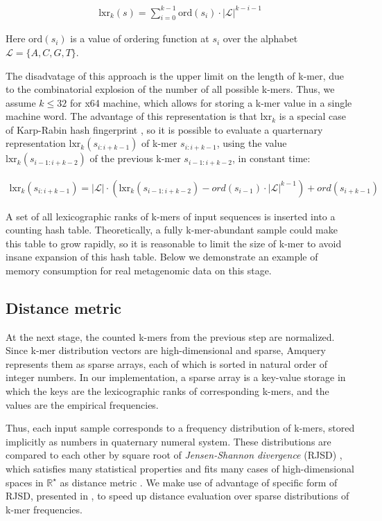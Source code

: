 \documentclass[10pt,letterpaper]{article}
\begin{document}
\begin{eqnarray}
\label{eq:schemeP}
    \mathrm{lxr}_k(s) = \sum_{i=0}^{k−1} \mathrm{ord}(s_i) \cdot |{\mathcal{L}}|^{k−i−1}
\end{eqnarray}

Here $\mathrm{ord}(s_i)$ is a value of ordering function at $s_i$ over the alphabet ${\mathcal{L}} = \{A, C, G, T \}$. 

The disadvatage of this approach is the upper limit on the length of k-mer, due to the combinatorial explosion of the number of all possible k-mers. Thus, we assume $k \leq 32$ for x64 machine, which allows for storing a k-mer value in a single machine word.
The advantage of this representation is that $\mathrm{lxr}_k$ is a special case of Karp-Rabin hash fingerprint \cite{karp1987efficient}, so it is possible to evaluate a quarternary representation $\mathrm{lxr}_k(s_{i:i+k-1})$ of k-mer $s_{i:i+k-1}$, using the value $\mathrm{lxr}_k(s_{i−1:i+k-2})$ of the previous k-mer $s_{i−1:i+k-2}$, in constant time:

\begin{eqnarray}
\label{eq:schemeP}
    \mathrm{lxr}_k(s_{i:i+k-1}) = |{\mathcal{L}}| \cdot (\mathrm{lxr}_k(s_{i−1:i+k-2}) − ord(s_{i−1}) \cdot 
									 |{\mathcal{L}}|^{k−1}) + ord(s_{i+k−1})
\end{eqnarray}

A set of all lexicographic ranks of k-mers of input sequences is inserted into a counting hash table. Theoretically, a fully k-mer-abundant sample could make this table to grow rapidly, so it is reasonable to limit the size of k-mer to avoid insane expansion of this hash table. Below we demonstrate an example of memory consumption for real metagenomic data on this stage.

\subsection*{Distance metric}
At the next stage, the counted k-mers from the previous step are normalized. Since k-mer distribution vectors are high-dimensional and sparse, Amquery represents them as sparse arrays, each of which is sorted in natural order of integer numbers. 
In our implementation, a sparse array is a key-value storage in which the keys are the lexicographic ranks of corresponding k-mers, and the values are the empirical frequencies.

Thus, each input sample corresponds to a frequency distribution of k-mers, stored implicitly as numbers in quaternary numeral system. These distributions are compared to each other by square root of \textit{Jensen-Shannon divergence} (RJSD) \cite{lin1991divergence}, which satisfies many statistical properties and fits many cases of high-dimensional spaces in $\mathbb{R^\star}$ as distance metric \cite{fuglede2004jensen, endres2003new}. We make use of advantage of specific form of RJSD, presented in \cite{connor2013evaluation}, to speed up distance evaluation over sparse distributions of k-mer frequencies.
\end{document}
